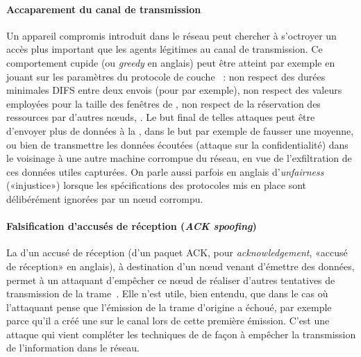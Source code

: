         \paragraph{Accaparement du canal de transmission}
Un appareil compromis introduit dans le réseau peut chercher à s'octroyer un accès plus important que les agents légitimes au canal de transmission.
Ce comportement cupide (ou \textit{greedy} en anglais) peut être atteint par exemple en jouant sur les paramètres du protocole de couche \mac~\cite{PI11}: non respect des durées minimales DIFS entre deux envois (pour \ieeee par exemple), non respect des valeurs employées pour la taille des fenêtres de , non respect de la réservation des ressources par d'autres nœuds, \etc.
Le but final de telles attaques peut être d'envoyer plus de données à la \sdb, dans le but par exemple de fausser une moyenne, ou bien de transmettre les données écoutées (attaque sur la confidentialité) dans le voisinage à une autre machine corrompue du réseau, en vue de l'exfiltration de ces données utiles capturées.
On parle aussi parfois en anglais d'\textit{unfairness} («injustice») lorsque les spécifications des protocoles mis en place sont délibérément ignorées par un nœud corrompu.

        \paragraph{Falsification d'accusés de réception (\textit{ACK spoofing})}
La  d'un accusé de réception (d'un paquet ACK, pour \textit{acknowledgement}, «accusé de réception» en anglais), à destination d'un nœud venant d'émettre des données, permet à un attaquant d'empêcher ce nœud de réaliser d'autres tentatives de transmission de la trame~\cite{AD14}.
Elle n'est utile, bien entendu, que dans le cas où l'attaquant pense que l'émission de la trame d'origine a échoué, par exemple parce qu'il a créé une  sur le canal lors de cette première émission.
C'est une attaque qui vient compléter les techniques de  de façon à empêcher la transmission de l'information dans le réseau.

